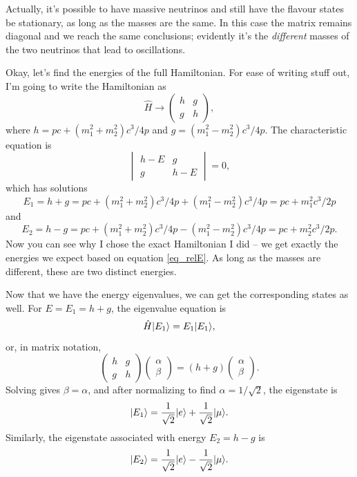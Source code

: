 Actually, it's possible to have massive neutrinos and still have the flavour states be stationary, as long as the masses are the same.  In this case the matrix remains diagonal and we reach the same conclusions; evidently it's the \emph{different} masses of the two neutrinos that lead to oscillations.

Okay, let's find the energies of the full Hamiltonian.  For ease of writing stuff out, I'm going to write the Hamiltonian as
\[
\hat{H} \to \begin{pmatrix}
h & g \\
g & h 
\end{pmatrix},
\]
where $h = pc + (m_1^2 + m_2^2) c^3/4p$ and $g = (m_1^2 - m_2^2)c^3/4p$.  The characteristic equation is
\[
\begin{vmatrix}
h - E & g \\
g & h - E
\end{vmatrix} = 0,
\]
which has solutions
\begin{equation}
E_1 = h + g = pc + (m_1^2 + m_2^2) c^3/4p + (m_1^2 - m_2^2)c^3/4p = pc + m_1^2 c^3 / 2p
\end{equation}
and
\begin{equation}
E_2 = h - g = pc + (m_1^2 + m_2^2) c^3/4p - (m_1^2 - m_2^2)c^3/4p = pc + m_2^2 c^3 / 2p.
\end{equation}
Now you can see why I chose the exact Hamiltonian I did -- we get exactly the energies we expect based on equation \ref{eq_relE}.  As long as the masses are different, these are two distinct energies.

Now that we have the energy eigenvalues, we can get the corresponding states as well.  For $E = E_1 = h + g$, the eigenvalue equation is
\[
\hat{H} | E_1 \rangle = E_1 | E_1 \rangle,
\]
or, in matrix notation,
\[
\begin{pmatrix}
h & g \\
g & h
\end{pmatrix} \begin{pmatrix}  \alpha \\ \beta \end{pmatrix} = (h+g) \begin{pmatrix}  \alpha \\ \beta \end{pmatrix}.
\]
Solving gives $\beta = \alpha$, and after normalizing to find $\alpha = 1/\sqrt{2}$, the eigenstate is 
\begin{equation}
\label{eq_E1}
| E_1 \rangle = \frac{1}{\sqrt{2}} | e \rangle + \frac{1}{\sqrt{2}} | \mu \rangle.
\end{equation}
Similarly, the eigenstate associated with energy $E_2 = h - g$ is
\begin{equation}
\label{eq_E2}
| E_2 \rangle = \frac{1}{\sqrt{2}} | e \rangle - \frac{1}{\sqrt{2}} | \mu \rangle.
\end{equation}


